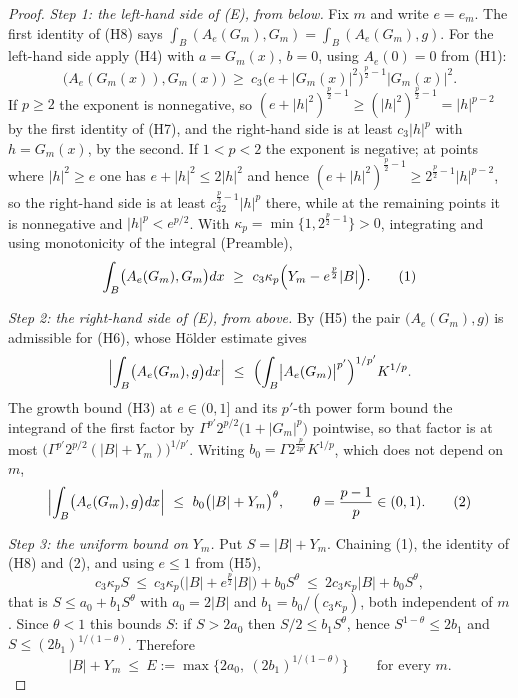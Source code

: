 \begin{proof}
\emph{Step 1: the left-hand side of (E), from below.}  Fix $m$ and write
$e=e_m$.  The first identity of (H8) says
$\int_B(A_{e}(G_m),G_m)=\int_B(A_{e}(G_m),g)$.  For the left-hand side apply
(H4) with $a=G_m(x)$, $b=0$, using $A_{e}(0)=0$ from (H1):
\[
\bigl(A_{e}(G_m(x)),G_m(x)\bigr)
\ \ge\ c_3\bigl(e+|G_m(x)|^2\bigr)^{\frac p2-1}|G_m(x)|^2 .
\]
If $p\ge2$ the exponent is nonnegative, so
$(e+|h|^2)^{\frac p2-1}\ge(|h|^2)^{\frac p2-1}=|h|^{p-2}$ by the first identity
of (H7), and the right-hand side is at least $c_3|h|^p$ with $h=G_m(x)$, by the
second.  If $1<p<2$ the exponent is negative; at points where $|h|^2\ge e$ one
has $e+|h|^2\le2|h|^2$ and hence
$(e+|h|^2)^{\frac p2-1}\ge2^{\frac p2-1}|h|^{p-2}$, so the right-hand side is at
least $c_32^{\frac p2-1}|h|^p$ there, while at the remaining points it is
nonnegative and $|h|^p<e^{p/2}$.  With
$\kappa_p=\min\{1,2^{\frac p2-1}\}>0$, integrating and using monotonicity of the
integral (Preamble),
\[
\int_B\bigl(A_{e}(G_m),G_m\bigr)dx
\ \ge\ c_3\kappa_p\Bigl(Y_m-e^{\frac p2}|B|\Bigr).
\tag{1}
\]

\emph{Step 2: the right-hand side of (E), from above.}  By (H5) the pair
$\bigl(A_{e}(G_m),g\bigr)$ is admissible for (H6), whose Hölder estimate gives
\[
\Bigl|\int_B\bigl(A_{e}(G_m),g\bigr)dx\Bigr|
\ \le\ \Bigl(\int_B\bigl|A_{e}(G_m)\bigr|^{p'}\Bigr)^{1/p'}K^{1/p}.
\]
The growth bound (H3) at $e\in(0,1]$ and its $p'$-th power form bound the
integrand of the first factor by
$\Gamma^{p'}2^{p/2}\bigl(1+|G_m|^p\bigr)$ pointwise, so that factor is at most
$\bigl(\Gamma^{p'}2^{p/2}(|B|+Y_m)\bigr)^{1/p'}$.  Writing
$b_0=\Gamma2^{\frac p{2p'}}K^{1/p}$, which does not depend on $m$,
\[
\Bigl|\int_B\bigl(A_{e}(G_m),g\bigr)dx\Bigr|
\ \le\ b_0\bigl(|B|+Y_m\bigr)^{\theta},
\qquad\theta=\frac{p-1}p\in(0,1).
\tag{2}
\]

\emph{Step 3: the uniform bound on $Y_m$.}  Put $S=|B|+Y_m$.  Chaining (1), the
identity of (H8) and (2), and using $e\le1$ from (H5),
\[
c_3\kappa_pS\ \le\ c_3\kappa_p\bigl(|B|+e^{\frac p2}|B|\bigr)+b_0S^{\theta}
\ \le\ 2c_3\kappa_p|B|+b_0S^{\theta},
\]
that is $S\le a_0+b_1S^{\theta}$ with $a_0=2|B|$ and $b_1=b_0/(c_3\kappa_p)$,
both independent of $m$.  Since $\theta<1$ this bounds $S$: if $S>2a_0$ then
$S/2\le b_1S^{\theta}$, hence $S^{1-\theta}\le2b_1$ and
$S\le(2b_1)^{1/(1-\theta)}$.  Therefore
\[
|B|+Y_m\ \le\ E:=\max\bigl\{2a_0,\ (2b_1)^{1/(1-\theta)}\bigr\}
\qquad\text{for every }m .
\tag{2a}
\]


\end{proof}
